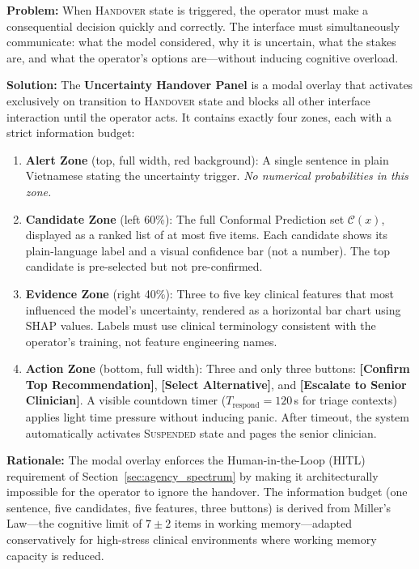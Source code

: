\begin{tcolorbox}[patternbox,
  title={Design Pattern 3 --- The Uncertainty Handover Panel}]
\textbf{Problem:} When \textsc{Handover} state is triggered, the
operator must make a consequential decision quickly and correctly.
The interface must simultaneously communicate: what the model
considered, why it is uncertain, what the stakes are, and what
the operator's options are---without inducing cognitive overload.

\textbf{Solution:} The \textbf{Uncertainty Handover Panel} is a
modal overlay that activates exclusively on transition to
\textsc{Handover} state and blocks all other interface interaction
until the operator acts.
It contains exactly four zones, each with a strict information
budget:

\begin{enumerate}
  \item \textbf{Alert Zone} (top, full width, red background):
    A single sentence in plain Vietnamese stating the
    uncertainty trigger.
    \emph{No numerical probabilities in this zone.}

  \item \textbf{Candidate Zone} (left 60\%):
    The full Conformal Prediction set $\mathcal{C}(x)$,
    displayed as a ranked list of at most five items.
    Each candidate shows its plain-language label and a
    visual confidence bar (not a number).
    The top candidate is pre-selected but not pre-confirmed.

  \item \textbf{Evidence Zone} (right 40\%):
    Three to five key clinical features that most influenced
    the model's uncertainty, rendered as a horizontal bar
    chart using SHAP values.
    Labels must use clinical terminology consistent with
    the operator's training, not feature engineering names.

  \item \textbf{Action Zone} (bottom, full width):
    Three and only three buttons:
    \textbf{[Confirm Top Recommendation]},
    \textbf{[Select Alternative]}, and
    \textbf{[Escalate to Senior Clinician]}.
    A visible countdown timer ($T_{\mathrm{respond}} = 120$\,s
    for triage contexts) applies light time pressure without
    inducing panic.
    After timeout, the system automatically activates
    \textsc{Suspended} state and pages the senior clinician.
\end{enumerate}

\textbf{Rationale:} The modal overlay enforces the
Human-in-the-Loop (HITL) requirement of
Section~\ref{sec:agency_spectrum} by making it architecturally
impossible for the operator to ignore the handover.
The information budget (one sentence, five candidates, five
features, three buttons) is derived from Miller's Law---the
cognitive limit of $7 \pm 2$ items in working
memory---adapted conservatively for
high-stress clinical environments where working memory capacity
is reduced.
\end{tcolorbox}

